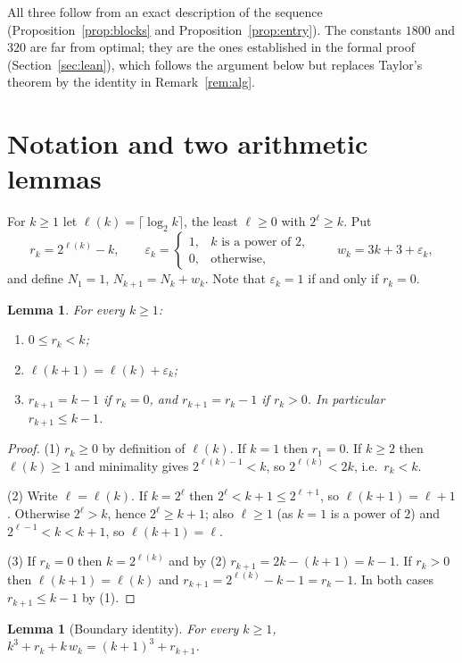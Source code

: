\documentclass[11pt]{amsart}
\newtheorem{lemma}[theorem]{Lemma}
\theoremstyle{remark}
\begin{document}
All three follow from an exact description of the sequence (Proposition~\ref{prop:blocks}
and Proposition~\ref{prop:entry}). The constants $1800$ and $320$ are far from optimal; they are
the ones established in the formal proof (Section~\ref{sec:lean}), which follows the argument
below but replaces Taylor's theorem by the identity in Remark~\ref{rem:alg}.

\section{Notation and two arithmetic lemmas}

For $k\ge1$ let $\ell(k)=\lceil\log_2 k\rceil$, the least $\ell\ge0$ with $2^\ell\ge k$. Put
\[
  r_k=2^{\ell(k)}-k,\qquad
  \varepsilon_k=\begin{cases}1,&k\text{ is a power of }2,\\0,&\text{otherwise},\end{cases}\qquad
  w_k=3k+3+\varepsilon_k,
\]
and define $N_1=1$, $N_{k+1}=N_k+w_k$. Note that $\varepsilon_k=1$ if and only if $r_k=0$.

\begin{lemma}\label{lem:offset}
For every $k\ge1$:
\begin{enumerate}
  \item $0\le r_k<k$;
  \item $\ell(k+1)=\ell(k)+\varepsilon_k$;
  \item $r_{k+1}=k-1$ if $r_k=0$, and $r_{k+1}=r_k-1$ if $r_k>0$. In particular $r_{k+1}\le k-1$.
\end{enumerate}
\end{lemma}

\begin{proof}
(1) $r_k\ge0$ by definition of $\ell(k)$. If $k=1$ then $r_1=0$. If $k\ge2$ then $\ell(k)\ge1$
and minimality gives $2^{\ell(k)-1}<k$, so $2^{\ell(k)}<2k$, i.e.\ $r_k<k$.

(2) Write $\ell=\ell(k)$. If $k=2^\ell$ then $2^\ell<k+1\le2^{\ell+1}$, so $\ell(k+1)=\ell+1$.
Otherwise $2^\ell>k$, hence $2^\ell\ge k+1$; also $\ell\ge1$ (as $k=1$ is a power of $2$) and
$2^{\ell-1}<k<k+1$, so $\ell(k+1)=\ell$.

(3) If $r_k=0$ then $k=2^{\ell(k)}$ and by (2) $r_{k+1}=2k-(k+1)=k-1$. If $r_k>0$ then
$\ell(k+1)=\ell(k)$ and $r_{k+1}=2^{\ell(k)}-k-1=r_k-1$. In both cases $r_{k+1}\le k-1$ by (1).
\end{proof}

\begin{lemma}[Boundary identity]\label{lem:boundary}
For every $k\ge1$, \ $k^3+r_k+k\,w_k=(k+1)^3+r_{k+1}$.
\end{lemma}
\end{document}
